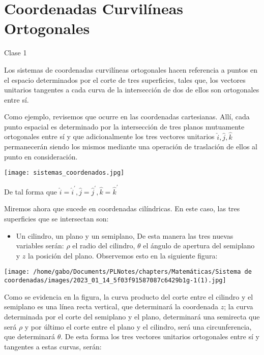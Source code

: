 
\graphicspath{ {chapters/Matemáticas/Sistema de coordenadas/images/} }

\chapter{Coordenadas Curvilíneas Ortogonales }

Clase 1

Los sistemas de coordenadas curvilíneas ortogonales hacen referencia a puntos en el espacio determinados por el corte de tres superficies, tales que, los vectores unitarios tangentes a cada curva de la intersección de dos de ellos son ortogonales entre sí.

Como ejemplo, revisemos que ocurre en las coordenadas cartesianas. Allí, cada punto espacial es determinado por la intersección de tres planos mutuamente ortogonales entre sí y que adicionalmente los tres vectores unitarios $\hat{i}, \hat{j}, \hat{k}$ permanecerán siendo los mismos mediante una operación de traslación de ellos al punto en consideración.

\begin{center}
  \texttt{[image: sistemas\_coordenados.jpg]}
\end{center}

De tal forma que $\hat{i}=\hat{i}^{\prime}, \hat{j}=\hat{j}^{\prime}, \hat{k}=\hat{k}^{\prime}$

Miremos ahora que sucede en coordenadas cilíndricas. En este caso, las tres superficies que se intersectan son:

\begin{itemize}
  \item Un cilindro, un plano y un semiplano, De esta manera las tres nuevas variables serán: $\rho$ el radio del cilindro, $\theta$ el ángulo de apertura del semiplano y $z$ la posición del plano. Observemos esto en la siguiente figura:
\end{itemize}

\begin{center}
\texttt{[image: /home/gabo/Documents/PLNotes/chapters/Matemáticas/Sistema de coordenadas/images/2023\_01\_14\_5f03f91587087c6429b1g-1(1).jpg]}
\end{center}

Como se evidencia en la figura, la curva producto del corte entre el cilindro y el semiplano es una línea recta vertical, que determinará la coordenada $z$; la curva determinada por el corte del semiplano y el plano, determinará una semirecta que será $\rho$ y por último el corte entre el plano y el cilindro, será una circunferencia, que determinará $\theta$. De esta forma los tres vectores unitarios ortogonales entre sí y tangentes a estas curvas, serán:


